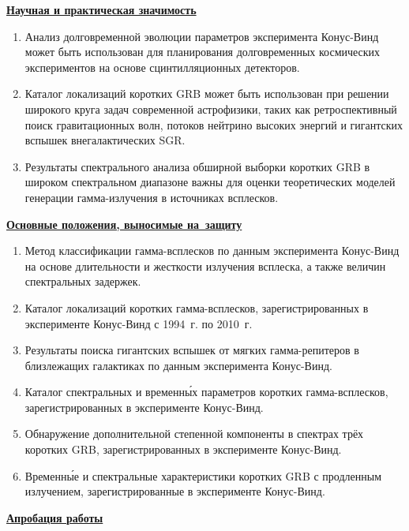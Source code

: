 \underline{\textbf{Научная и практическая значимость}} 
\begin{enumerate}
\item Анализ долговременной эволюции параметров эксперимента Конус-Винд может быть использован
 для планирования долговременных космических экспериментов на основе сцинтилляционных детекторов.
\item Каталог локализаций коротких GRB может быть использован при решении 
 широкого круга задач современной астрофизики, таких как ретроспективный поиск гравитационных волн, потоков 
 нейтрино высоких энергий и гигантских вспышек внегалактических SGR.
\item Результаты спектрального анализа обширной выборки коротких GRB 
 в широком спектральном диапазоне важны для оценки теоретических 
 моделей генерации гамма-излучения в источниках всплесков.
\end{enumerate}


\underline{\textbf{Основные положения, выносимые на~защиту}}
\begin{enumerate}
\item Метод классификации гамма-всплесков по данным эксперимента Конус-Винд на основе
    длительности и жесткости излучения всплеска, а также величин спектральных задержек.
\item Каталог локализаций коротких гамма-всплесков, зарегистрированных в эксперименте
    Конус-Винд с 1994~г. по 2010~г.
\item Результаты поиска гигантских вспышек от мягких гамма-репитеров 
    в близлежащих галактиках по данным эксперимента Конус-Винд. 
\item Каталог спектральных и временн\'{ы}х параметров коротких гамма-всплесков, 
    зарегистрированных в эксперименте Конус-Винд.
\item Обнаружение дополнительной степенной компоненты в спектрах трёх коротких GRB, 
    зарегистрированных в эксперименте Конус-Винд.
\item Временн\'{ы}е и спектральные характеристики коротких GRB 
    с продленным излучением, зарегистрированные в эксперименте Конус-Винд.
\end{enumerate}


\underline{\textbf{Апробация работы}}

